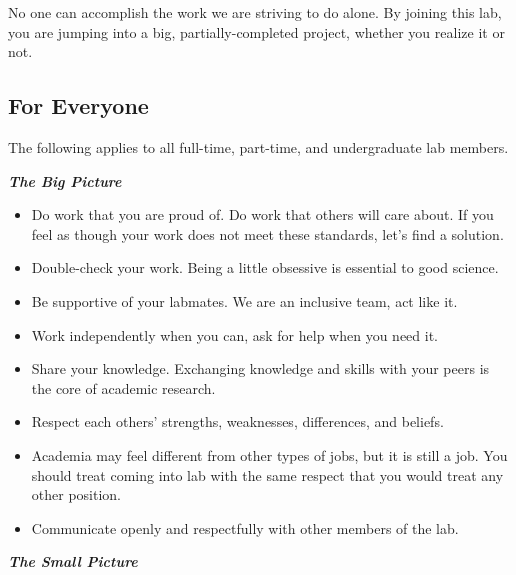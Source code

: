 \documentclass[
]{book}
\providecommand{\tightlist}{%
  \setlength{\itemsep}{0pt}\setlength{\parskip}{0pt}}
\begin{document}
No one can accomplish the work we are striving to do alone. By joining this lab, you are jumping into a big, partially-completed project, whether you realize it or not.

\hypertarget{for-everyone}{%
\subsection{For Everyone}\label{for-everyone}}

The following applies to all full-time, part-time, and undergraduate lab members.

\textbf{\emph{The Big Picture}}

\begin{itemize}
\tightlist
\item
  Do work that you are proud of. Do work that others will care about. If you feel as though your work does not meet these standards, let's find a solution.
\item
  Double-check your work. Being a little obsessive is essential to good science.
\item
  Be supportive of your labmates. We are an inclusive team, act like it.
\item
  Work independently when you can, ask for help when you need it.
\item
  Share your knowledge. Exchanging knowledge and skills with your peers is the core of academic research.
\item
  Respect each others' strengths, weaknesses, differences, and beliefs.
\item
  Academia may feel different from other types of jobs, but it is still a job. You should treat coming into lab with the same respect that you would treat any other position.
\item
  Communicate openly and respectfully with other members of the lab.
\end{itemize}

\textbf{\emph{The Small Picture}}
\end{document}
